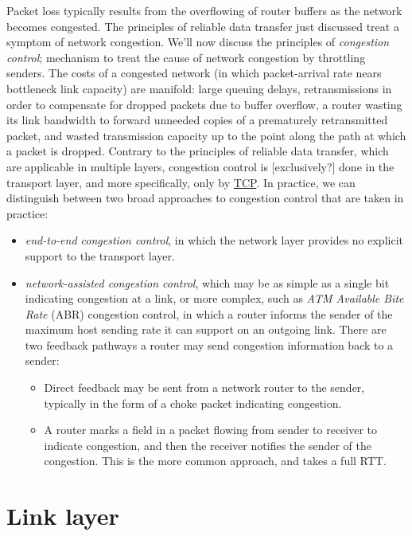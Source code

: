\documentclass[table, xcdraw]{article}%
\begin{document}
Packet loss typically results from the overflowing of router buffers as the network becomes congested. The principles of reliable data transfer just discussed treat a symptom of network congestion. We'll now discuss the principles of \emph{congestion control}; mechanism to treat the cause of network congestion by throttling senders. The costs of a congested network (in which packet-arrival rate nears bottleneck link capacity) are manifold: large queuing delays, retransmissions in order to compensate for dropped packets due to buffer overflow, a router wasting its link bandwidth to forward unneeded copies of a prematurely retransmitted packet, and wasted transmission capacity up to the point along the path at which a packet is dropped. Contrary to the principles of reliable data transfer, which are applicable in multiple layers, congestion control is [exclusively?] done in the transport layer, and more specifically, only by \hyperref[ch:transport:tcp]{TCP}. In practice, we can distinguish between two broad approaches to congestion control that are taken in practice:

\begin{itemize}
    \item \emph{end-to-end congestion control}, in which the network layer provides no explicit support to the transport layer.
    \item \emph{network-assisted congestion control}, which may be as simple as a single bit indicating congestion at a link, or more complex, such as \emph{ATM Available Bite Rate} (ABR) congestion control, in which a router informs the sender of the maximum host sending rate it can support on an outgoing link. There are two feedback pathways a router may send congestion information back to a sender:
    \begin{itemize}
        \item Direct feedback may be sent from a network router to the sender, typically in the form of a choke packet indicating congestion.
        \item A router marks a field in a packet flowing from sender to receiver to indicate congestion, and then the receiver notifies the sender of the congestion. This is the more common approach, and takes a full RTT.
    \end{itemize}
\end{itemize}

\section{Link layer} \label{ch:link}
\end{document}
